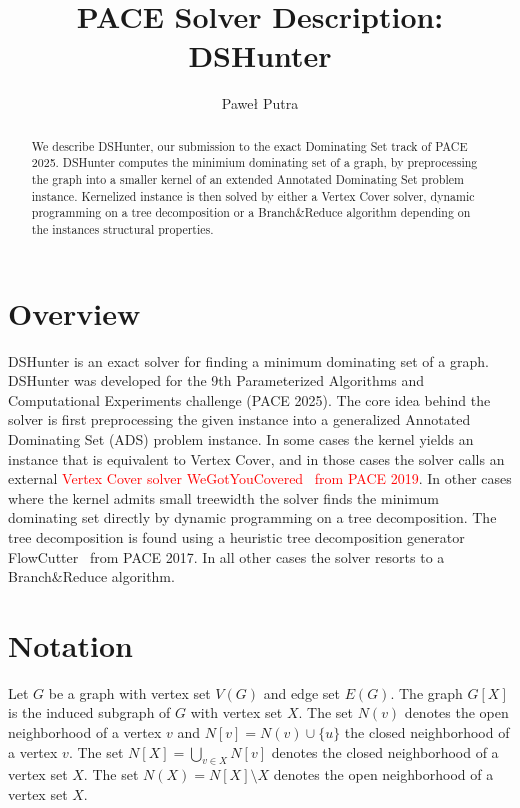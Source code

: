 \documentclass[a4paper,UKenglish,cleveref, autoref, thm-restate]{lipics-v2021}
\title{PACE Solver Description: DSHunter} %
\author{Paweł Putra}{University of Warsaw, Poland }{pawelputra0@gmail.com}{}{}%
\begin{document}
\maketitle

\begin{abstract}
We describe DSHunter, our submission to the exact Dominating Set track of PACE 2025. DSHunter computes the minimium dominating set of a graph, by preprocessing the graph
into a smaller kernel of an extended Annotated Dominating Set problem instance. 
Kernelized instance is then solved by either a Vertex Cover solver, dynamic programming on a tree decomposition or a Branch\&Reduce algorithm depending on the instances structural properties.
\end{abstract}

\section{Overview}
\label{sec:overview}

DSHunter is an exact solver for finding a minimum dominating set of a graph. DSHunter was developed for the 9th Parameterized Algorithms and Computational Experiments challenge (PACE 2025).
The core idea behind the solver is first preprocessing the given instance into a generalized Annotated Dominating Set (ADS) problem instance.
In some cases the kernel yields an instance that is equivalent to Vertex Cover, and in those cases the solver calls an external \textcolor{red}{Vertex Cover solver WeGotYouCovered~\cite{DBLP:conf/siamcsc/HespeL0S20} from PACE 2019}.
In other cases where the kernel admits small treewidth the solver finds the minimum dominating set directly by dynamic programming on a tree decomposition.
The tree decomposition is found using a heuristic tree decomposition generator  FlowCutter~\cite{DBLP:conf/alenex/HamannS16} from PACE 2017.
In all other cases the solver resorts to a Branch\&Reduce algorithm.


\section{Notation}

Let $G$ be a graph with vertex set $V(G)$ and edge set $E(G)$. The graph $G[X]$ is the induced subgraph of $G$ with vertex set $X$.
The set $N(v)$ denotes the open neighborhood of a vertex $v$ and $N[v] = N(v) \cup \{u\}$ the closed neighborhood of a vertex $v$.
The set $N[X] = \bigcup_{v \in X} N[v]$ denotes the closed neighborhood of a vertex set $X$.
The set $N(X) = N[X] \setminus X$ denotes the open neighborhood of a vertex set $X$.
\end{document}
